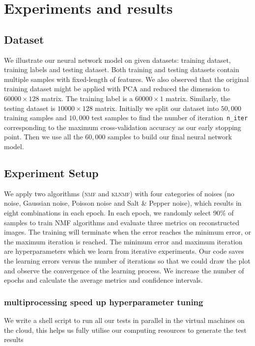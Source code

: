 \section{Experiments and results}\label{chapter4}




\subsection{Dataset}
We illustrate our neural network model on given datasets: training dataset, training labels and testing dataset.
Both training and testing datasets contain multiple samples with fixed-length of features.
We also observed that the original training dataset might be applied with PCA and reduced the dimension to $60000 \times 128$ matrix.
The training label is a $60000 \times 1$ matrix.
Similarly, the testing dataset is $10000 \times 128$ matrix.
Initially we split our dataset into $50,000$ training samples and $10,000$ test samples to find the number of iteration~\texttt{n\_iter} corresponding to the maximum cross-validation accuracy as our early stopping point.
Then we use all the $60,000$ samples to build our final neural network model.

\subsection{Experiment Setup}
We apply two algorithms (\textsc{nmf} and \textsc{klnmf}) with four categories of noises (no noise, Gaussian noise, Poisson noise and Salt \& Pepper noise), which results in eight combinations in each epoch. In each epoch, we randomly select 90\% of samples to train NMF algorithms and evaluate three metrics on reconstructed images. The training will terminate when the error reaches the minimum error, or the maximum iteration is reached. The minimum error and maximum iteration are hyperparameters which we learn from iterative experiments. Our code saves the learning errors versus the number of iterations so that we could draw the plot and observe the convergence of the learning process. We increase the number of epochs and calculate the average metrics and confidence intervals.

\subsubsection{multiprocessing speed up hyperparameter tuning}
We write a shell script to run all our tests in parallel in the virtual machines on the cloud,
this helps us fully utilise our computing resources to generate the test results

